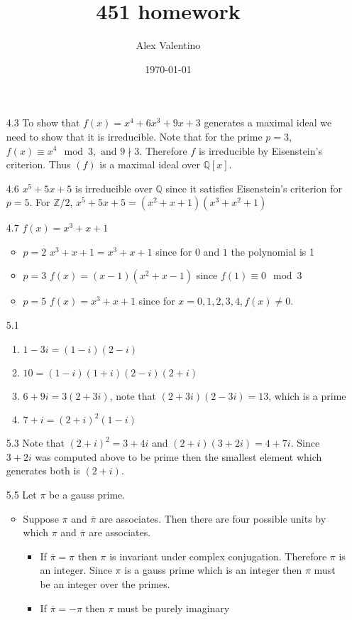 \documentclass[12pt, letterpaper]{article}
\date{\today}
\author{Alex Valentino}
\title{451 homework}
\newcommand{\Z}{\mathbb{Z}}
\newcommand{\Q}{\mathbb{Q}}
\begin{document}
\begin{enumerate}
	\item[4.3] To show that $f(x) = x^4 + 6x^3 + 9x + 3$ generates a maximal ideal we 
	need to show that it is irreducible.  Note that for the prime $p=3$, 
	$f(x) \equiv x^4 \mod{3}, \text{ and } 9 \nmid 3$.  Therefore $f$ is irreducible by 
	Eisenstein's criterion.  Thus $(f)$ is a maximal ideal over $\Q[x]$.  
	\item[4.6] $x^5 + 5x + 5$ is irreducible over $\Q$ since it satisfies Eisenstein's criterion for $p=5$. For $\Z/2$, $x^5 + 5x + 5 = (x^2 + x + 1)(x^3 + x^2 + 1)$
	\item[4.7] $f(x) = x^3 + x + 1$
	\begin{itemize}
		\item $p=2$ $x^3 + x + 1 = x^3 + x + 1$ since for $0$ and $1$ the polynomial is 1
		\item $p=3$ $f(x) = (x-1)(x^2 + x - 1)$ since $f(1) \equiv 0 \mod{3}$
		\item $p=5$ $f(x) = x^3 + x + 1$ since for $x = 0,1,2,3,4, f(x) \neq 0$.
	\end{itemize}
	\item[5.1]
	\begin{enumerate}
		\item $1-3i = (1-i)(2-i)$ 
		\item $10 = (1-i)(1+i)(2-i)(2+i)$
		\item $6+9i = 3(2+3i)$, note that $(2+3i)(2-3i) = 13$, which is a prime
		\item $7+i = (2+i)^2(1-i)$
	\end{enumerate}
	\item[5.3] Note that $(2+i)^2 = 3+4i$ and $(2+i)(3+2i) = 4+7i$.  Since $3+2i$
	was computed above to be prime then the smallest element which generates both
	is $(2+i)$.
	\item[5.5] Let $\pi$ be a gauss prime.  
	\begin{itemize}
		\item Suppose $\pi$ and $\overline{\pi}$ are associates.  Then there are four possible units by which $\pi$ and $\overline{\pi}$ are associates.
		\begin{itemize}
			\item If $\overline{\pi} = \pi$ then $\pi$ is invariant under 
			complex conjugation.  Therefore $\pi$ is an integer.  Since $\pi$
			is a gauss prime which is an integer then $\pi$ must be an integer 
			over the primes.  
			\item If $\overline{\pi} = -\pi$ then $\pi$ must be purely imaginary

\end{itemize}
\end{itemize}
\end{enumerate}
\end{document}

